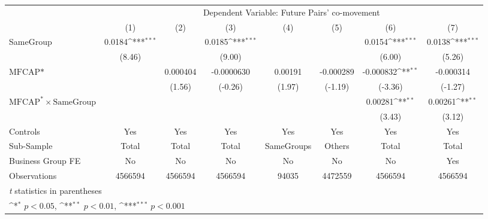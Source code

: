 {
\def\sym#1{\ifmmode^{#1}\else\(^{#1}\)\fi}
\begin{tabular}{l*{7}{c}}
\hline\hline
                &\multicolumn{7}{c}{Dependent Variable: Future Pairs' co-movement}                                                                   \\\cmidrule(lr){2-8}
                &\multicolumn{1}{c}{(1)}         &\multicolumn{1}{c}{(2)}         &\multicolumn{1}{c}{(3)}         &\multicolumn{1}{c}{(4)}         &\multicolumn{1}{c}{(5)}         &\multicolumn{1}{c}{(6)}         &\multicolumn{1}{c}{(7)}         \\
\hline
SameGroup       &   0.0184\sym{***}&                  &   0.0185\sym{***}&                  &                  &   0.0154\sym{***}&   0.0138\sym{***}\\
                &   (8.46)         &                  &   (9.00)         &                  &                  &   (6.00)         &   (5.26)         \\
[1em]
$ \text{MFCAP*} $&                  & 0.000404         &-0.0000630         &  0.00191         &-0.000289         &-0.000832\sym{**} &-0.000314         \\
                &                  &   (1.56)         &  (-0.26)         &   (1.97)         &  (-1.19)         &  (-3.36)         &  (-1.27)         \\
[1em]
 $ \text{MFCAP}^* \times {\text{SameGroup} }  $ &                  &                  &                  &                  &                  &  0.00281\sym{**} &  0.00261\sym{**} \\
                &                  &                  &                  &                  &                  &   (3.43)         &   (3.12)         \\
\hline
Controls        &      Yes         &      Yes         &      Yes         &      Yes         &      Yes         &      Yes         &      Yes         \\
Sub-Sample      &    Total         &    Total         &    Total         &SameGroups         &   Others         &    Total         &    Total         \\
Business Group FE&       No         &       No         &       No         &       No         &       No         &       No         &      Yes         \\
Observations    &  4566594         &  4566594         &  4566594         &    94035         &  4472559         &  4566594         &  4566594         \\
\hline\hline
\multicolumn{8}{l}{\footnotesize \textit{t} statistics in parentheses}\\
\multicolumn{8}{l}{\footnotesize \sym{*} \(p<0.05\), \sym{**} \(p<0.01\), \sym{***} \(p<0.001\)}\\
\end{tabular}
}
